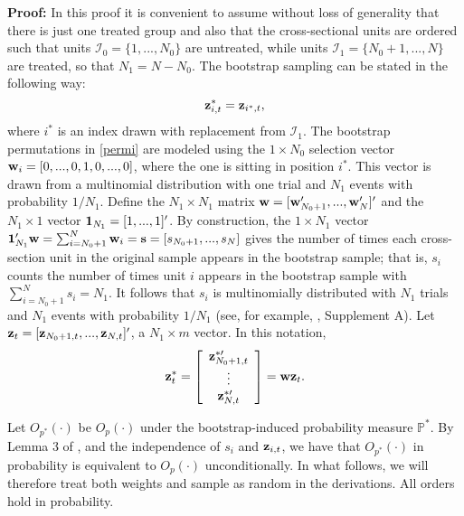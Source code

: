 \documentclass[12pt,fleqn]{article}
\begin{document}
\bigskip

\noindent\textbf{Proof:} In this proof it is convenient to assume without loss of generality that there is just one treated group and also that the cross-sectional units are ordered such that units $\mathcal{I}_0 = \{1,...,N_0\}$ are untreated, while units $\mathcal{I}_{1} = \{N_0+1,...,N\}$ are treated, so that $N_1 = N-N_0$. The bootstrap sampling can be stated in the following way:
\begin{equation}\label{permi}
\mathbf{z}_{i,t}^* = \mathbf{z}_{i^*,t},
\end{equation}
where $i^*$ is an index drawn with replacement from $\mathcal{I}_{1}$. The bootstrap permutations in \eqref{permi} are modeled using the $1 \times N_0$ selection vector $\mathbf{w}_i = [0,...,0,1,0,...,0]$, where the one is sitting in position $i^*$. This vector is drawn from a multinomial distribution with one trial and $N_{1}$ events with probability $1/N_{1}$. Define the $N_{1}\times N_{1}$ matrix $\mathbf{w} = [\mathbf{w}_{N_0+1}',...,\mathbf{w}_{N}']'$ and the $N_{1}\times 1$ vector $\mathbf{1}_{N_{1}} = [1,...,1]'$. By construction, the $1\times N_{1}$ vector $\mathbf{1}_{N_{1}}'\mathbf{w} = \sum_{i=N_0+ 1}^{N} \mathbf{w}_i = \mathbf{s} = [s_{N_0+ 1},...,s_{N}]$ gives the number of times each cross-section unit in the original sample appears in the bootstrap sample; that is, $s_i$ counts the number of times unit $i$ appears in the bootstrap sample with $\sum_{i=N_0+1}^{N} s_i = N_1$. It follows that $s_i$ is multinomially distributed with $N_{1}$ trials and $N_{1}$ events with probability $1/N_{1}$ (see, for example,
\citealp{de2024cross}, Supplement A). Let $\mathbf{z}_{t} = [\mathbf{z}_{N_0 +1,t},...,\mathbf{z}_{N,t}]'$, a $N_{1}\times m$ vector. In this notation,
\begin{equation}\label{perm}
\mathbf{z}_{t}^* = \left[ \begin{array}{c}
                     \mathbf{z}_{N_0 +1,t}^{*\prime} \\
                     \vdots \\
                     \mathbf{z}_{N,t}^{*\prime}
                   \end{array}
\right] = \mathbf{w}\mathbf{z}_{t}.
\end{equation}

Let $O_{p^*} (\cdot )$ be $O_{p} (\cdot )$ under the bootstrap-induced probability measure $\mathbb{P}^*$. By Lemma 3 of \citet{cheng2010bootstrap}, and the independence of $s_i$ and $\mathbf{z}_{i,t}$, we have that $O_{p^*} (\cdot )$ in probability is equivalent to $O_{p} (\cdot )$ unconditionally. In what follows, we will therefore treat both weights and sample as random in the derivations. All orders hold in probability.
\end{document}
